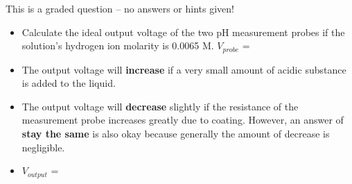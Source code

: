 \vfil 

\eject






This is a graded question -- no answers or hints given!







\begin{itemize}
\item{} Calculate the ideal output voltage of the two pH measurement probes if the solution's hydrogen ion molarity is 0.0065 M.  $V_{probe}$ = 
\vskip 5pt
\item{} The output voltage will {\bf increase} if a very small amount of acidic substance is added to the liquid.
\vskip 5pt
\item{} The output voltage will {\bf decrease} slightly if the resistance of the measurement probe increases greatly due to coating.  However, an answer of {\bf stay the same} is also okay because generally the amount of decrease is negligible.
\vskip 5pt
\item{} $V_{output}$ = 
\end{itemize}




